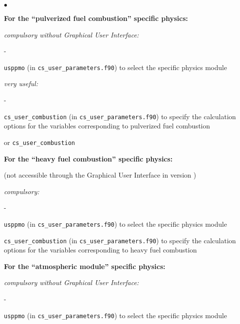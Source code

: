 {{{{{\begin{list}{$\bullet$}{}
\begin{list}{}{}
  \item{\bf For the ``pulverized fuel combustion'' specific physics:}

    \begin{list}{}{}
        \item {\em compulsory without Graphical User Interface:}
        \begin{list}{-}{}
            \item \texttt{usppmo} (in \texttt{cs\_user\_parameters.f90})
               to select the specific physics module
        \end{list}

        \item {\em very useful:}
        \begin{list}{-}{}
            \item  \texttt{cs\_user\_combustion}
               (in \texttt{cs\_user\_parameters.f90})
               to specify the calculation options
                   for the variables
                   corresponding to pulverized fuel combustion
        \end{list}
    \end{list}

or \texttt{cs\_user\_combustion}
  \item{\bf For the ``heavy fuel combustion'' specific physics:}

 (not accessible through the Graphical User Interface in version \verscs)
    \begin{list}{}{}
        \item {\em compulsory:}
        \begin{list}{-}{}
            \item \texttt{usppmo} (in \texttt{cs\_user\_parameters.f90})
               to select the specific physics module
            \item \texttt{cs\_user\_combustion}
               (in \texttt{cs\_user\_parameters.f90})
               to specify the calculation options
                   for the variables
                   corresponding to heavy fuel combustion
        \end{list}
    \end{list}


     \item{\bf For the ``atmospheric module'' specific physics:}

    \begin{list}{}{}
       \item {\em compulsory without Graphical User Interface:}
        \begin{list}{-}{}
            \item \texttt{usppmo} (in \texttt{cs\_user\_parameters.f90})
                  to select the specific physics module
        \end{list}


\end{list}
\end{list}
\end{list}}}}}}
